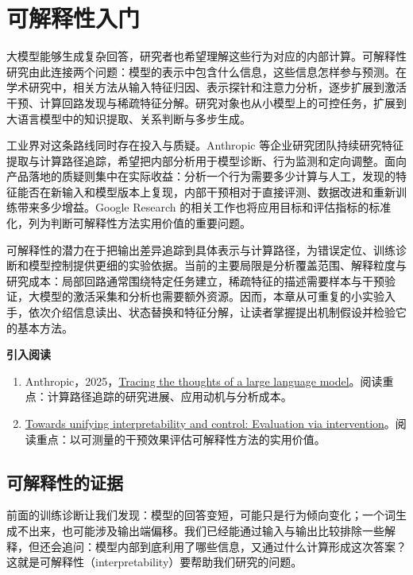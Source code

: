 \chapter{可解释性入门}\label{可解释性入门}

大模型能够生成复杂回答，研究者也希望理解这些行为对应的内部计算。可解释性研究由此连接两个问题：模型的表示中包含什么信息，这些信息怎样参与预测。在学术研究中，相关方法从输入特征归因、表示探针和注意力分析，逐步扩展到激活干预、计算回路发现与稀疏特征分解。研究对象也从小模型上的可控任务，扩展到大语言模型中的知识提取、关系判断与多步生成。

工业界对这条路线同时存在投入与质疑。Anthropic 等企业研究团队持续研究特征提取与计算路径追踪，希望把内部分析用于模型诊断、行为监测和定向调整。面向产品落地的质疑则集中在实际收益：分析一个行为需要多少计算与人工，发现的特征能否在新输入和模型版本上复现，内部干预相对于直接评测、数据改进和重新训练带来多少增益。Google Research 的相关工作也将应用目标和评估指标的标准化，列为判断可解释性方法实用价值的重要问题。

可解释性的潜力在于把输出差异追踪到具体表示与计算路径，为错误定位、训练诊断和模型控制提供更细的实验依据。当前的主要局限是分析覆盖范围、解释粒度与研究成本：局部回路通常围绕特定任务建立，稀疏特征的描述需要样本与干预验证，大模型的激活采集和分析也需要额外资源。因而，本章从可重复的小实验入手，依次介绍信息读出、状态替换和特征分解，让读者掌握提出机制假设并检验它的基本方法。

\textbf{引入阅读}
\begin{enumerate}
    \item Anthropic，2025，\href{https://www.anthropic.com/research/tracing-thoughts-language-model}{Tracing the thoughts of a large language model}。阅读重点：计算路径追踪的研究进展、应用动机与分析成本。
    \item \href{https://research.google/pubs/towards-unifying-interpretability-and-control-evaluation-via-intervention/}{Towards unifying interpretability and control: Evaluation via intervention}。阅读重点：以可测量的干预效果评估可解释性方法的实用价值。
\end{enumerate}

\section{可解释性的证据}\label{可解释性的证据}

前面的训练诊断让我们发现：模型的回答变短，可能只是行为倾向变化；一个词生成不出来，也可能涉及输出端偏移。我们已经能通过输入与输出比较排除一些解释，但还会追问：模型内部到底利用了哪些信息，又通过什么计算形成这次答案？这就是可解释性（interpretability）要帮助我们研究的问题。

